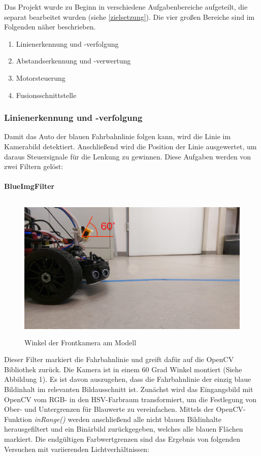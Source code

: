 \documentclass[12pt, a4paper]{scrartcl}
\begin{document}
Das Projekt wurde zu Beginn in verschiedene Aufgabenbereiche aufgeteilt, die separat bearbeitet wurden (siehe \autoref{zielsetzung}). Die vier großen Bereiche sind im Folgenden näher beschrieben.

\begin{enumerate}
	\item Linienerkennung und -verfolgung
	\item Abstandserkennung und -verwertung
	\item Motorsteuerung
	\item Fusionsschnittstelle
\end{enumerate}


\subsubsection{Linienerkennung und -verfolgung}
Damit das Auto der blauen Fahrbahnlinie folgen kann, wird die Linie im Kamerabild detektiert. Anschließend wird die Position der Linie ausgewertet, um daraus Steuersignale für die Lenkung zu gewinnen. Diese Aufgaben werden von zwei Filtern gelöst:

\paragraph{BlueImgFilter}
\begin{figure}[h]
	\centering
	\includegraphics[width=\textwidth, height=7cm, keepaspectratio]{Bilder/carCameraFrontAngle60.jpg}
	\caption{Winkel der Frontkamera am Modell}
	\label{img:carCameraFrontAngle60}
\end{figure}

Dieser Filter markiert die Fahrbahnlinie und greift dafür auf die OpenCV Bibliothek zurück. Die Kamera ist in einem 60 Grad Winkel montiert (Siehe Abbildung 1). Es ist davon auszugehen, dass die Fahrbahnlinie der einzig blaue Bildinhalt im relevanten Bildausschnitt ist. Zunächst wird das Eingangsbild mit OpenCV vom RGB- in den HSV-Farbraum transformiert, um die Festlegung von Ober- und Untergrenzen für Blauwerte zu vereinfachen. Mittels der OpenCV-Funktion \emph{inRange()} werden anschließend alle nicht blauen Bildinhalte herausgefiltert und ein Binärbild zurückgegeben, welches alle blauen Flächen markiert. Die endgültigen Farbwertgrenzen sind das Ergebnis von folgenden Versuchen mit variierenden Lichtverhältnissen:
\end{document}
